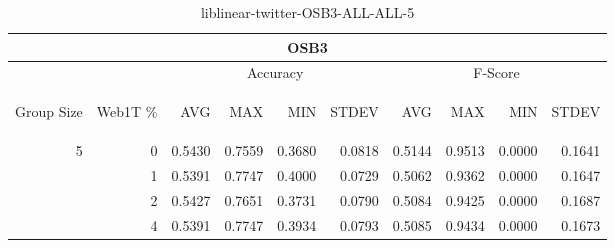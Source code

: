 \begin{center}
\begin{table}[htbp] 
 \begin{center}
\begin{tabular}{ | r | r | r | r | r | r | r | r | r | r |}
\hline
\multicolumn{10}{|c|}{OSB3}\\
\hline
 & & \multicolumn{4}{|c|}{Accuracy} & \multicolumn{4}{|c|}{F-Score}\\ \cline{3-10}
\begin{sideways}Group Size\end{sideways} & \begin{sideways}Web1T \%\end{sideways} & \begin{sideways}AVG\end{sideways} & \begin{sideways}MAX\end{sideways} & \begin{sideways}MIN\end{sideways} & \begin{sideways}STDEV\end{sideways} & \begin{sideways}AVG\end{sideways} & \begin{sideways}MAX\end{sideways} & \begin{sideways}MIN\end{sideways} & \begin{sideways}STDEV\end{sideways}\\
\hline
\multirow{3}{*}{5}
 & 0 & 0.5430 & 0.7559 & 0.3680 & 0.0818 & 0.5144 & 0.9513 & 0.0000 & 0.1641\\ \cline{2-10}
 & 1 & 0.5391 & 0.7747 & 0.4000 & 0.0729 & 0.5062 & 0.9362 & 0.0000 & 0.1647\\ \cline{2-10}
 & 2 & 0.5427 & 0.7651 & 0.3731 & 0.0790 & 0.5084 & 0.9425 & 0.0000 & 0.1687\\ \cline{2-10}
 & 4 & 0.5391 & 0.7747 & 0.3934 & 0.0793 & 0.5085 & 0.9434 & 0.0000 & 0.1673\\ \cline{2-10}
\hline
\end{tabular}
\caption{liblinear-twitter-OSB3-ALL-ALL-5}
\label{table:liblinear-twitter-OSB3-ALL-ALL-5}
\end{center}
 \end{table}
\end{center}

